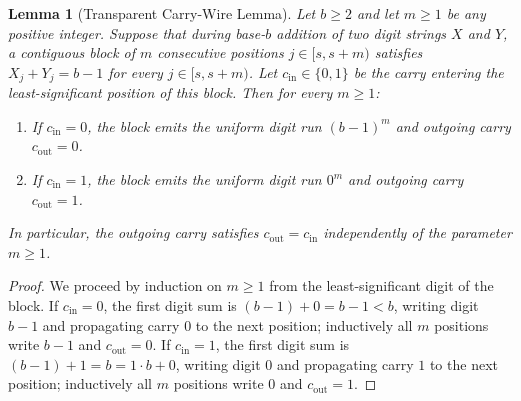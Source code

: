 \documentclass[11pt,a4paper]{article}
\newtheorem{lemma}[theorem]{Lemma}
\theoremstyle{definition}
\theoremstyle{remark}
\begin{document}
\begin{lemma}[Transparent Carry-Wire Lemma]
\label{lem:wire}
Let $b \ge 2$ and let $m \ge 1$ be any positive integer. Suppose that during base-$b$ addition of two digit strings $X$ and $Y$, a contiguous block of $m$ consecutive positions $j \in [s, s+m)$ satisfies $X_j + Y_j = b - 1$ for every $j \in [s, s+m)$. Let $c_{\mathrm{in}} \in \{0, 1\}$ be the carry entering the least-significant position of this block. Then for every $m \ge 1$:
\begin{enumerate}
  \item If $c_{\mathrm{in}} = 0$, the block emits the uniform digit run $(b-1)^m$ and outgoing carry $c_{\mathrm{out}} = 0$.
  \item If $c_{\mathrm{in}} = 1$, the block emits the uniform digit run $0^m$ and outgoing carry $c_{\mathrm{out}} = 1$.
\end{enumerate}
In particular, the outgoing carry satisfies $c_{\mathrm{out}} = c_{\mathrm{in}}$ independently of the parameter $m \ge 1$.
\end{lemma}

\begin{proof}
We proceed by induction on $m \ge 1$ from the least-significant digit of the block. If $c_{\mathrm{in}} = 0$, the first digit sum is $(b-1) + 0 = b - 1 < b$, writing digit $b-1$ and propagating carry $0$ to the next position; inductively all $m$ positions write $b-1$ and $c_{\mathrm{out}} = 0$. If $c_{\mathrm{in}} = 1$, the first digit sum is $(b-1) + 1 = b = 1 \cdot b + 0$, writing digit $0$ and propagating carry $1$ to the next position; inductively all $m$ positions write $0$ and $c_{\mathrm{out}} = 1$.
\end{proof}
\end{document}
